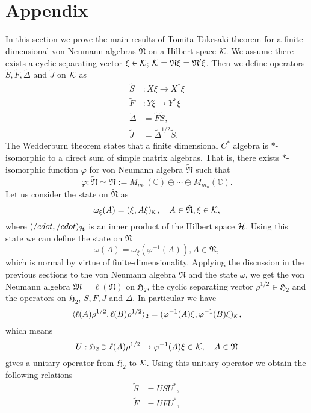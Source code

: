 \section{Appendix}
In this section we prove the main results of Tomita-Takesaki theorem for a finite dimensional
von Neumann algebras $\tilde{\mathfrak{N}}$ on a Hilbert space $\cal{K}$.
We assume there exists a cyclic separating vector $\xi\in \cal{K}$;
$\cal{K}=\tilde{\mathfrak{N}}\xi=\tilde{\mathfrak{N}}^\prime\xi$.
Then we define operators $\tilde{S},\tilde{F},\tilde{\Delta}$ and $\tilde{J}$ on $\cal{K}$ as
\begin{equation}
\begin{split}
\tilde{S}&:X\xi \to X^\ast \xi \\
\tilde{F}&:Y\xi \to Y^\ast \xi \\
\tilde{\Delta}&=\tilde{F}\tilde{S},\\
\tilde{J}&=\tilde{\Delta}^{1/2}\tilde{S}.
\end{split}
\end{equation}
The Wedderburn theorem states that a finite dimensional $C^{\ast}$ algebra is  $\ast$-isomorphic to a direct sum of simple matrix algebras. That is, there exists $\ast$-isomorphic function $\varphi$ for von Neumann algebra $\tilde{\mathfrak{N}}$ such that
$$
\varphi:\tilde{\mathfrak{N}}\simeq \mathfrak{N}:=M_{m_1}(\mathbb{C})\oplus \cdots \oplus M_{m_n}(\mathbb{C}).
$$
Let us consider the state on $\tilde{\mathfrak{N}}$ as
$$
\omega_\xi(A)=(\xi,A\xi)_{\cal K},\quad A\in \tilde{\mathfrak{N}},\xi\in \cal{K},
$$
where $(/cdot,/cdot)_{\cal H}$ is an inner product of the Hilbert space ${\cal H}$.
Using this state we can define the state on $\mathfrak{N}$
$$
\omega(A)=\omega_\xi(\varphi^{-1}(A)),A\in \mathfrak{N},
$$
which is normal by virtue of finite-dimensionality.
Applying the discussion in the previous sections to the von Neumann algebra $\mathfrak{N}$ and the state
$\omega$, we get
the von Neumann algebra $\mathfrak{M}=\ell (\mathfrak{N})$ on  
$\mathfrak{H}_2$, the cyclic separating vector $\rho^{1/2}\in \mathfrak{H}_2$
and the operators on $\mathfrak{H}_2$, $S, F, J$ and $\Delta$.
In particular we have
$$
\langle \ell(A)\rho^{1/2},\ell( B)\rho^{1/2}\rangle_2=(\varphi^{-1}(A)\xi,\varphi^{-1}(B)\xi)_{\cal K},
$$
which means
$$
U:\mathfrak{H}_2\ni\ell(A)\rho^{1/2}\to \varphi^{-1}(A)\xi\in {\cal K}, \quad A\in \mathfrak{N}
$$
gives a unitary operator from $\mathfrak{H}_2$ to ${\cal K}$.
Using this unitary operator we obtain the following relations
\begin{equation}
\begin{split}
\tilde{S}&=US U^{\ast},\\
\tilde{F}&=UFU^\ast ,
\end{split}
\end{equation}
